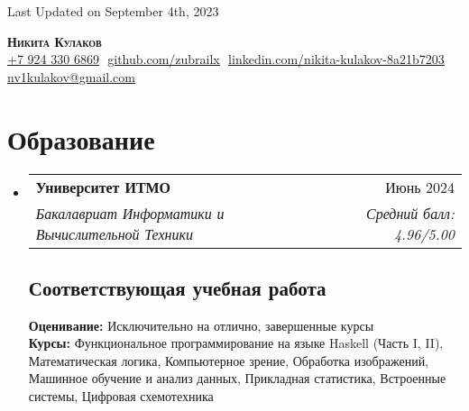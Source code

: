 \documentclass[letterpaper,11pt]{article}
\makeatletter
\newcommand{\resumeSubheading}[4]{
  \vspace{-2pt}\item
    \begin{tabular*}{0.97\textwidth}[t]{l@{\extracolsep{\fill}}r}
      \textbf{#1} & #2 \\
      \textit{\small#3} & \textit{\small #4} \\
    \end{tabular*}\vspace{-7pt}
}
\newcommand{\resumeSubHeadingListStart}{\begin{itemize}[leftmargin=0.15in, label={}]}
\newcommand{\resumeSubHeadingListEnd}{\end{itemize}}
\makeatother
\begin{document}
\begin{flushright}
  \vspace{-4pt}
  \color{gray}
  \item
  Last Updated on September 4th, 2023
\end{flushright}

\vspace{-7pt}

\begin{center}
    \textbf{\huge \scshape Никита Кулаков} \\ \vspace{8pt}
    \small 
    \href{tel:79243306869}{\underline{+7 924 330 6869}} $  $
    \href{https://github.com/zubrailx}{\underline{github.com/zubrailx}} $  $
    \href{https://www.linkedin.com/in/nikita-kulakov-8a21b7203/}{\underline{linkedin.com/nikita-kulakov-8a21b7203}} $  $
    \href{mailto:nv1kulakov@gmail.com}
    {\underline{nv1kulakov@gmail.com}}
\end{center}

\section{Образование}
  \resumeSubHeadingListStart
  
    \resumeSubheading
      {Университет ИТМО}{Июнь 2024}
      {Бакалавриат Информатики и Вычислительной Техники}{Средний балл: 4.96/5.00}
      
    \subsection{Соответствующая учебная работа}
      \textbf{Оценивание:} Исключительно на отлично, завершенные курсы\\
      \textbf{Курсы:} Функциональное программирование на языке Haskell (Часть I, II), Математическая логика, Компьютерное зрение, Обработка изображений, Машинное обучение и анализ данных, Прикладная статистика, Встроенные системы, Цифровая схемотехника\\

  \resumeSubHeadingListEnd

\end{document}
